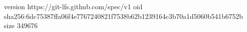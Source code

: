 version https://git-lfs.github.com/spec/v1
oid sha256:6dc75387ffa06f4e7767240821f7538b62b1239164c3b70a1d5060b541b6752b
size 349676
